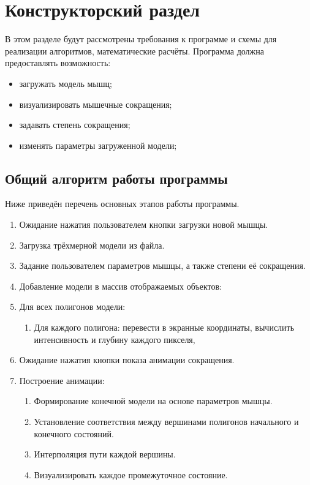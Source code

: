 \chapter{Конструкторский раздел}
\label{cha:design}
В этом разделе будут рассмотрены требования к программе и схемы для реализации алгоритмов, математические расчёты.
Программа должна предоставлять возможность:
\begin{itemize}
	\item загружать модель мышц;
	\item визуализировать мышечные сокращения;
	\item задавать степень сокращения;
	\item изменять параметры загруженной модели;
\end{itemize}
\section{Общий алгоритм работы программы}
\label{sec:general}
Ниже приведён перечень основных этапов работы программы.
\begin{enumerate}
	\item Ожидание нажатия пользователем кнопки загрузки новой мышцы.
	\item Загрузка трёхмерной модели из файла.
	\item Задание пользователем параметров мышцы, а также степени её сокращения.
	\item Добавление модели в массив отображаемых объектов:
	\item Для всех полигонов модели:
	\begin{enumerate}
		\item Для каждого полигона: перевести в экранные координаты, вычислить интенсивность и глубину каждого пикселя, 
	\end{enumerate}
	\item Ожидание нажатия кнопки показа анимации сокращения.
	\item Построение анимации:
	\begin{enumerate}
		\item Формирование конечной модели на основе параметров мышцы.
		\item Установление соответствия между вершинами полигонов начального и конечного состояний.
		\item Интерполяция пути каждой вершины.
		\item Визуализировать каждое промежуточное состояние.
	\end{enumerate}
\end{enumerate}
